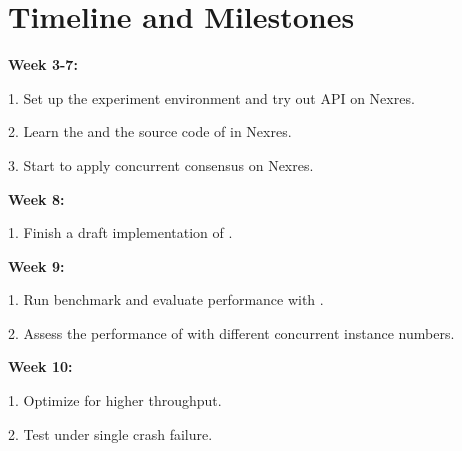 \section{Timeline and Milestones}
\textbf{Week 3-7:}
\par 1. Set up the experiment environment and try out API on Nexres.
\par 2. Learn the \RCC{} and the source code of \PBFT{} in Nexres.
\par 3. Start to apply concurrent consensus on Nexres. 

\noindent
\textbf{Week 8:}
\par 1. Finish a draft implementation of \RCC{}.

\noindent
\textbf{Week 9:}
\par 1. Run benchmark and evaluate performance with \PBFT{}.
\par 2. Assess the performance of \RCC{} with different concurrent instance numbers.

\noindent
\textbf{Week 10:}
\par 1. Optimize for higher throughput.
\par 2. Test under single crash failure.